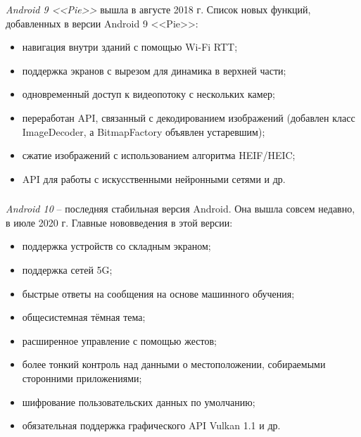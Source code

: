 \textit{Android 9 <<Pie>>} вышла в августе 2018 г. \cite{android_release_notes}
Список новых функций, добавленных в версии Android 9 <<Pie>>:
\begin{itemize}
	\item навигация внутри зданий с помощью Wi-Fi RTT;
	\item поддержка экранов с вырезом для динамика в верхней части;
	\item одновременный доступ к видеопотоку с нескольких камер;
	\item переработан API, связанный с декодированием изображений (добавлен класс ImageDecoder, а BitmapFactory объявлен устаревшим);
	\item сжатие изображений с использованием алгоритма HEIF/HEIC;
	\item API для работы с искусственными нейронными сетями и др. \cite{android_pie}
\end{itemize}


\subsubsection{}
\label{subsub:android_platform:history:android_10}

\textit{Android 10} -- последняя стабильная версия Android.
Она вышла совсем недавно, в июле 2020 г. \cite{android_release_notes}
Главные нововведения в этой версии:
\begin{itemize}
	\item поддержка устройств со складным экраном;
	\item поддержка сетей 5G;
	\item быстрые ответы на сообщения на основе машинного обучения;
	\item общесистемная тёмная тема;
	\item расширенное управление с помощью жестов;
	\item более тонкий контроль над данными о местоположении, собираемыми сторонними приложениями;
	\item шифрование пользовательских данных по умолчанию;
	\item обязательная поддержка графического API Vulkan 1.1 и др. \cite{android_10}
\end{itemize}


\subsubsection{}
\label{subsub:android_platform:history:android_11}

